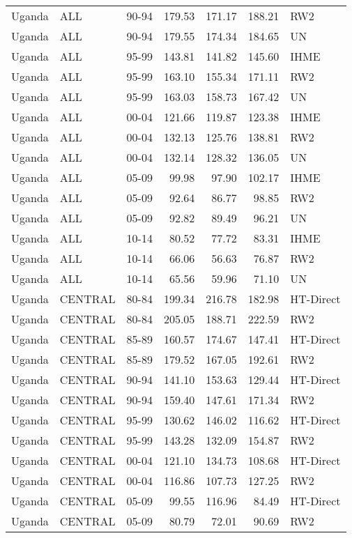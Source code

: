 \begin{longtable}{lllrrrl}
  Uganda & ALL & 90-94 & 179.53 & 171.17 & 188.21 & RW2 \\ 
  Uganda & ALL & 90-94 & 179.55 & 174.34 & 184.65 & UN \\ 
  Uganda & ALL & 95-99 & 143.81 & 141.82 & 145.60 & IHME \\ 
  Uganda & ALL & 95-99 & 163.10 & 155.34 & 171.11 & RW2 \\ 
  Uganda & ALL & 95-99 & 163.03 & 158.73 & 167.42 & UN \\ 
  Uganda & ALL & 00-04 & 121.66 & 119.87 & 123.38 & IHME \\ 
  Uganda & ALL & 00-04 & 132.13 & 125.76 & 138.81 & RW2 \\ 
  Uganda & ALL & 00-04 & 132.14 & 128.32 & 136.05 & UN \\ 
  Uganda & ALL & 05-09 & 99.98 & 97.90 & 102.17 & IHME \\ 
  Uganda & ALL & 05-09 & 92.64 & 86.77 & 98.85 & RW2 \\ 
  Uganda & ALL & 05-09 & 92.82 & 89.49 & 96.21 & UN \\ 
  Uganda & ALL & 10-14 & 80.52 & 77.72 & 83.31 & IHME \\ 
  Uganda & ALL & 10-14 & 66.06 & 56.63 & 76.87 & RW2 \\ 
  Uganda & ALL & 10-14 & 65.56 & 59.96 & 71.10 & UN \\ 
  Uganda & CENTRAL & 80-84 & 199.34 & 216.78 & 182.98 & HT-Direct \\ 
  Uganda & CENTRAL & 80-84 & 205.05 & 188.71 & 222.59 & RW2 \\ 
  Uganda & CENTRAL & 85-89 & 160.57 & 174.67 & 147.41 & HT-Direct \\ 
  Uganda & CENTRAL & 85-89 & 179.52 & 167.05 & 192.61 & RW2 \\ 
  Uganda & CENTRAL & 90-94 & 141.10 & 153.63 & 129.44 & HT-Direct \\ 
  Uganda & CENTRAL & 90-94 & 159.40 & 147.61 & 171.34 & RW2 \\ 
  Uganda & CENTRAL & 95-99 & 130.62 & 146.02 & 116.62 & HT-Direct \\ 
  Uganda & CENTRAL & 95-99 & 143.28 & 132.09 & 154.87 & RW2 \\ 
  Uganda & CENTRAL & 00-04 & 121.10 & 134.73 & 108.68 & HT-Direct \\ 
  Uganda & CENTRAL & 00-04 & 116.86 & 107.73 & 127.25 & RW2 \\ 
  Uganda & CENTRAL & 05-09 & 99.55 & 116.96 & 84.49 & HT-Direct \\ 
  Uganda & CENTRAL & 05-09 & 80.79 & 72.01 & 90.69 & RW2 \\ 

\end{longtable}
